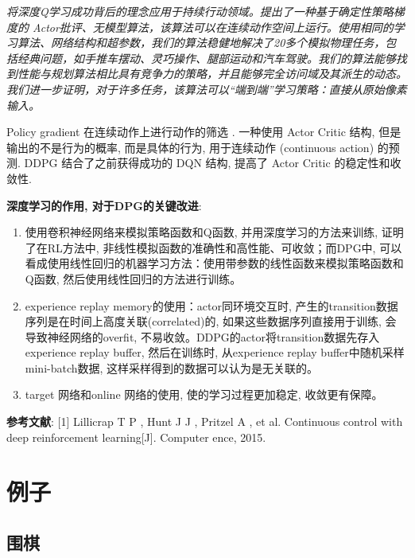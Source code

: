 \documentclass{article}
\begin{document}
        \textit{将深度Q学习成功背后的理念应用于持续行动领域。提出了一种基于确定性策略梯度的 Actor批评、无模型算法，该算法可以在连续动作空间上运行。使用相同的学习算法、网络结构和超参数，我们的算法稳健地解决了20多个模拟物理任务，包括经典问题，如手推车摆动、灵巧操作、腿部运动和汽车驾驶。我们的算法能够找到性能与规划算法相比具有竞争力的策略，并且能够完全访问域及其派生的动态。我们进一步证明，对于许多任务，该算法可以“端到端”学习策略：直接从原始像素输入。}

        
        Policy gradient 在连续动作上进行动作的筛选 . 一种使用 Actor Critic 结构, 但是输出的不是行为的概率, 而是具体的行为, 用于连续动作 (continuous action) 的预测. DDPG 结合了之前获得成功的 DQN 结构, 提高了 Actor Critic 的稳定性和收敛性.
        
        \textbf{深度学习的作用, 对于DPG的关键改进}:
        \begin{enumerate}
            \item 使用卷积神经网络来模拟策略函数和Q函数, 并用深度学习的方法来训练, 证明了在RL方法中, 非线性模拟函数的准确性和高性能、可收敛；而DPG中, 可以看成使用线性回归的机器学习方法：使用带参数的线性函数来模拟策略函数和Q函数, 然后使用线性回归的方法进行训练。
            \item experience replay memory的使用：actor同环境交互时, 产生的transition数据序列是在时间上高度关联(correlated)的, 如果这些数据序列直接用于训练, 会导致神经网络的overfit, 不易收敛。DDPG的actor将transition数据先存入experience replay buffer, 然后在训练时, 从experience replay buffer中随机采样mini-batch数据, 这样采样得到的数据可以认为是无关联的。
            \item target 网络和online 网络的使用,  使的学习过程更加稳定, 收敛更有保障。
        \end{enumerate}
    
        \textbf{参考文献}: [1] Lillicrap T P ,  Hunt J J ,  Pritzel A , et al. Continuous control with deep reinforcement learning[J]. Computer ence, 2015.
        
        
        
\section{例子}
    \subsection{围棋}
\end{document}
